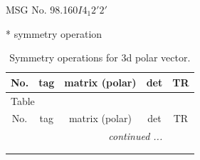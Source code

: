 \documentclass[fleqn,8pt]{jsarticle}
\begin{document}
\setcounter{MaxMatrixCols}{32}

\renewcommand{\tablename}{Table~}
\renewcommand{\figurename}{Figure~}
\begin{center}
\LARGE
MSG No. 98.160\quad$I4_{1}2'2'$
\end{center}
* symmetry operation
\renewcommand{\arraystretch}{1.3}
\begin{longtable}{ccccc}
\caption{Symmetry operations for 3d polar vector.}
 \\
 \hline \hline
No. & tag & matrix (polar) & det & TR \\ \hline \endfirsthead

\multicolumn{4}{l}{\tablename\ \thetable{}} \\
 \hline \hline
No. & tag & matrix (polar) & det & TR \\ \hline \endhead

 \hline \hline
\multicolumn{4}{r}{\footnotesize\it continued ...} \\ \endfoot

 \hline \hline
\multicolumn{4}{r}{} \\ \endlastfoot


\end{longtable}
\end{document}

